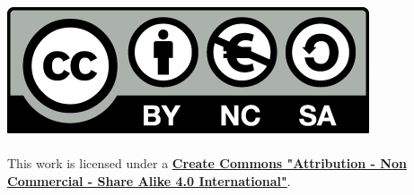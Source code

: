 \thispagestyle{empty}
\vspace*{\fill}

\begin{center}
    \href{https://creativecommons.org/licenses/by-nc-sa/4.0/deed.el}{\includegraphics[scale=0.2]{images/cc.png}} \\
    \Rule \\[0.4cm]
     This work is licensed under a \textbf{\href{https://creativecommons.org/licenses/by-nc-sa/4.0/deed.el}{Create Commons "Attribution - Non Commercial - Share Alike 4.0 International"}}. \\ 
\end{center}

\newpage